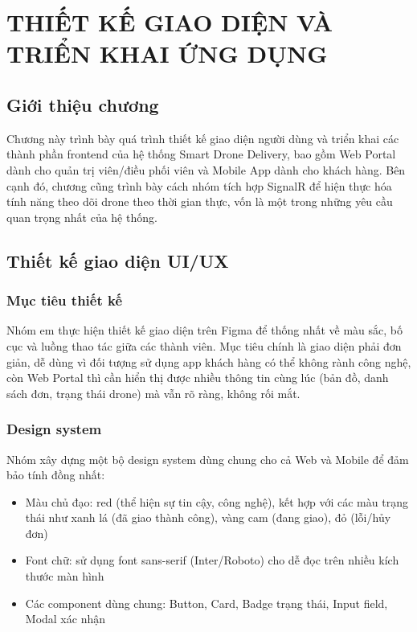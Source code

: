 ﻿\chapter{THIẾT KẾ GIAO DIỆN VÀ TRIỂN KHAI ỨNG DỤNG}

\section{Giới thiệu chương}

Chương này trình bày quá trình thiết kế giao diện người dùng và triển khai các thành phần frontend của hệ thống Smart Drone Delivery, bao gồm Web Portal dành cho quản trị viên/điều phối viên và Mobile App dành cho khách hàng. Bên cạnh đó, chương cũng trình bày cách nhóm tích hợp SignalR để hiện thực hóa tính năng theo dõi drone theo thời gian thực, vốn là một trong những yêu cầu quan trọng nhất của hệ thống.

\section{Thiết kế giao diện UI/UX}

\subsection{Mục tiêu thiết kế}

Nhóm em thực hiện thiết kế giao diện trên Figma để thống nhất về màu sắc, bố cục và luồng thao tác giữa các thành viên. Mục tiêu chính là giao diện phải đơn giản, dễ dùng vì đối tượng sử dụng app khách hàng có thể không rành công nghệ, còn Web Portal thì cần hiển thị được nhiều thông tin cùng lúc (bản đồ, danh sách đơn, trạng thái drone) mà vẫn rõ ràng, không rối mắt.

\subsection{Design system}

Nhóm xây dựng một bộ design system dùng chung cho cả Web và Mobile để đảm bảo tính đồng nhất:

\begin{itemize}[label={}]
    \item Màu chủ đạo: red (thể hiện sự tin cậy, công nghệ), kết hợp với các màu trạng thái như xanh lá (đã giao thành công), vàng cam (đang giao), đỏ (lỗi/hủy đơn)
    \item Font chữ: sử dụng font sans-serif (Inter/Roboto) cho dễ đọc trên nhiều kích thước màn hình
    \item Các component dùng chung: Button, Card, Badge trạng thái, Input field, Modal xác nhận

\end{itemize}

